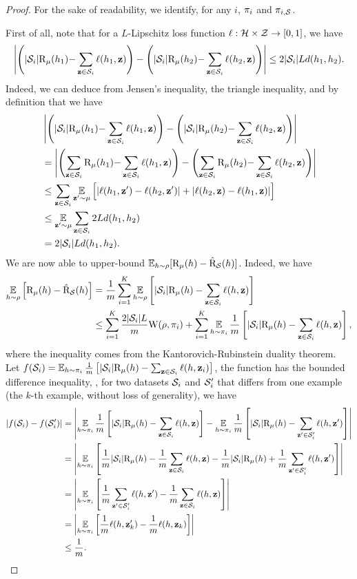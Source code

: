 \documentclass{article}
\begin{document}
\begin{proof}
For the sake of readability, we identify, for any $i$, $\P_i $ and $\P_{i,\S}$.

First of all, note that for a $L$-Lipschitz loss function $\loss: \H\times\Z\to[0,1]$, we have
\begin{align}
\LN\LP |\S_i|\Risk_{\D}(h_1){-}\sum_{\z\in\S_i}\loss(h_1, \z)\RP - \LP |\S_i|\Risk_{\D}(h_2){-}\sum_{\z\in\S_i}\loss(h_2, \z)\RP\RN \le 2|\S_i|Ld(h_1, h_2).\label{eq:alt-proof-supervised-1}
\end{align}
Indeed, we can deduce  from Jensen's inequality, the triangle inequality, and by definition that we have
\begin{align*}
&\LN\LP |\S_i|\Risk_{\D}(h_1){-}\sum_{\z\in\S_i}\loss(h_1, \z)\RP - \LP |\S_i|\Risk_{\D}(h_2){-}\sum_{\z\in\S_i}\loss(h_2, \z)\RP\RN\\
&= \LN\LP\sum_{\z\in\S_i}\Risk_{\D}(h_1){-}\sum_{\z\in\S_i}\loss(h_1, \z)\RP - \LP\sum_{\z\in\S_i}\Risk_{\D}(h_2){-}\sum_{\z\in\S_i}\loss(h_2, \z)\RP\RN\\
&\le \sum_{\z\in\S_i}\EE_{\z'\sim\D}\Big[ |\loss(h_1, \z')-\loss(h_2, \z')|+|\loss(h_2, \z)-\loss(h_1, \z)|\Big]\\
&\le \EE_{\z'\sim\D}\sum_{\z\in\S_i} 2Ld(h_1, h_2)\\
&= 2|\S_i|Ld(h_1, h_2).
\end{align*}
We are now able to upper-bound $\EE_{h\sim\Q}[ \Risk_{\D}(h) - \Riskhat_{\S}(h) ]$. 
Indeed, we have
\begin{align}
\EE_{h\sim\Q}\Big[ \Risk_{\D}(h) - \Riskhat_{\S}(h) \Big] &= \frac{1}{m}\sum_{i=1}^{K} \EE_{h\sim\Q}\LB |\S_i|\Risk_{\D}(h) - \sum_{\z\in\S_i}\loss(h, \z) \RB\nonumber\\
&\le \sum_{i=1}^{K} \frac{2|\S_i|L}{m}\W(\Q, \P_i) + \sum_{i=1}^{K} \EE_{h\sim\P_i} \frac{1}{m}\LB |\S_i|\Risk_{\D}(h) - \sum_{\z\in\S_i} \loss(h, \z) \RB,\label{eq:alt-proof-supervised-2}
\end{align}
where the inequality comes from the Kantorovich-Rubinstein duality theorem.
Let $f(\S_i)=\EE_{h\sim\P_i} \frac{1}{m}\LB |\S_i|\Risk_{\D}(h) - \sum_{\z\in\S_i} \loss(h, \z_i)\RB$, the function has the bounded difference inequality, \ie, for two datasets $\S_i$ and $\S'_i$ that differs from one example (the $k$-th example, without loss of generality), we have
\begin{align*}
\LN f(\S_i) - f(\S'_i) \RN &= \LN \EE_{h\sim\P_i} \frac{1}{m}\LB |\S_i|\Risk_{\D}(h) - \sum_{\z\in\S_i} \loss(h, \z)\RB - \EE_{h\sim\P_i} \frac{1}{m}\LB |\S_i|\Risk_{\D}(h) - \sum_{\z'\in\S'_i} \loss(h, \z')\RB \RN\\
&= \LN \EE_{h\sim\P_i} \LB \frac{1}{m}|\S_i|\Risk_{\D}(h) - \frac{1}{m}\sum_{\z\in\S_i} \loss(h, \z) - \frac{1}{m}|\S_i|\Risk_{\D}(h) + \frac{1}{m}\sum_{\z'\in\S'_i} \loss(h, \z')\RB \RN\\
&= \LN \EE_{h\sim\P_i} \LB \frac{1}{m}\sum_{\z'\in\S'_i} \loss(h, \z') - \frac{1}{m}\sum_{\z\in\S_i} \loss(h, \z)\RB \RN\\
&= \LN \EE_{h\sim\P_i} \LB \frac{1}{m}\loss(h, \z'_k) - \frac{1}{m}\loss(h, \z_k)\RB \RN\\
&\le \frac{1}{m}.
\end{align*}


\end{proof}
\end{document}
